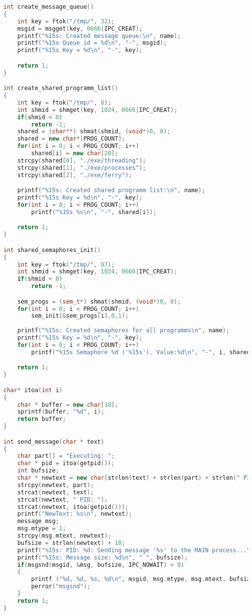 \documentclass{article}
\begin{document}
\begin{lstlisting}[language=C++]
int create_message_queue()
{
    int key = ftok("/tmp/", 32);
    msgid = msgget(key, 0666|IPC_CREAT);
    printf("%15s: Created message queue:\n", name);
    printf("%15s Queue id = %d\n", "-", msgid);
    printf("%15s Key = %d\n", "-", key);

    return 1;
}

int create_shared_programm_list()
{
    int key = ftok("/tmp/", 8);
    int shmid = shmget(key, 1024, 0666|IPC_CREAT);
    if(shmid < 0)
        return -1;
    shared = (char**) shmat(shmid, (void*)0, 0);
    shared = new char*[PROG_COUNT];
    for(int i = 0; i < PROG_COUNT; i++)
        shared[i] = new char[20];
    strcpy(shared[0], "./exe/threading");
    strcpy(shared[1], "./exe/processes");
    strcpy(shared[2], "./exe/ferry");

    printf("%15s: Created shared programm list:\n", name);
    printf("%15s Key = %d\n", "-", key);
    for(int i = 0; i < PROG_COUNT; i++)
        printf("%15s %s\n", "-", shared[i]);

    return 1;
}

int shared_semaphores_init()
{
    int key = ftok("/tmp/", 97);
    int shmid = shmget(key, 1024, 0666|IPC_CREAT);
    if(shmid < 0)
        return -1;

    sem_progs = (sem_t*) shmat(shmid, (void*)0, 0);
    for(int i = 0; i < PROG_COUNT; i++)
        sem_init(&sem_progs[i],0,1);
    
    printf("%15s: Created semaphores for all programms\n", name);
    printf("%15s Key = %d\n", "-", key);
    for(int i = 0; i < PROG_COUNT; i++)
        printf("%15s Semaphore %d ('%15s'). Value:%d\n", "-", i, shared[i], get_sem_value(sem_progs[i]));

    return 1;
}

char* itoa(int i)
{
    char * buffer = new char[10];
    sprintf(buffer, "%d", i);
    return buffer;
}

int send_message(char * text)
{  
    char part[] = "Executing: ";
    char * pid = itoa(getpid());
    int bufsize;
    char * newtext = new char[strlen(text) + strlen(part) + strlen(" PID: ") + strlen(pid) + 1];
    strcpy(newtext, part);
    strcat(newtext, text);
    strcat(newtext, " PID: ");
    strcat(newtext, itoa(getpid()));
    printf("NewText: %s\n", newtext);
    message msg;
    msg.mtype = 1;
    strcpy(msg.mtext, newtext);
    bufsize = strlen(newtext) + 10;
    printf("%15s: PID: %d: Sending message '%s' to the MAIN process...\n", "CHILD PROCESS", getpid(), newtext);
    printf("%15s: Message size: %d\n", " ", bufsize);
    if(msgsnd(msgid, &msg, bufsize, IPC_NOWAIT) < 0)
    {
        printf ("%d, %d, %s, %d\n", msgid, msg.mtype, msg.mtext, bufsize);
        perror("msgsnd");
    }
    return 1;
}


\end{lstlisting}
\end{document}
